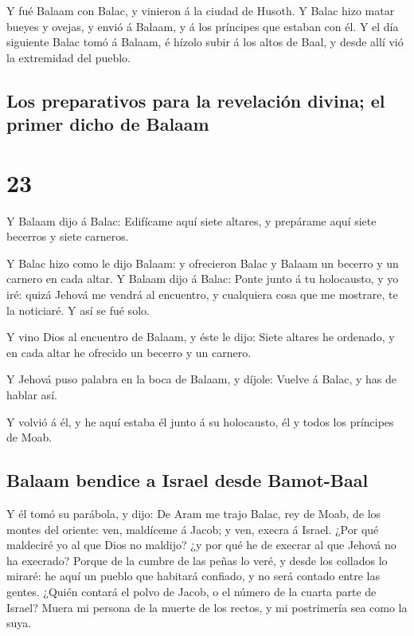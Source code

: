  Y fué Balaam con Balac, y vinieron á la ciudad de
Husoth.  Y Balac hizo matar bueyes y ovejas, y envió á
Balaam, y á los príncipes que estaban con él.  Y el día
siguiente Balac tomó á Balaam, é hízolo subir á los altos de Baal, y
desde allí vió la extremidad del pueblo.

\hypertarget{los-preparativos-para-la-revelaciuxf3n-divina-el-primer-dicho-de-balaam}{%
\subsection{Los preparativos para la revelación divina; el primer dicho
de
Balaam}\label{los-preparativos-para-la-revelaciuxf3n-divina-el-primer-dicho-de-balaam}}

\hypertarget{section-22}{%
\section{23}\label{section-22}}

 Y Balaam dijo á Balac: Edifícame aquí siete altares, y
prepárame aquí siete becerros y siete carneros.

 Y Balac hizo como le dijo Balaam: y ofrecieron Balac y
Balaam un becerro y un carnero en cada altar.  Y Balaam
dijo á Balac: Ponte junto á tu holocausto, y yo iré: quizá Jehová me
vendrá al encuentro, y cualquiera cosa que me mostrare, te la noticiaré.
Y así se fué solo.

 Y vino Dios al encuentro de Balaam, y éste le dijo: Siete
altares he ordenado, y en cada altar he ofrecido un becerro y un
carnero.

 Y Jehová puso palabra en la boca de Balaam, y díjole:
Vuelve á Balac, y has de hablar así.

 Y volvió á él, y he aquí estaba él junto á su holocausto,
él y todos los príncipes de Moab.

\hypertarget{balaam-bendice-a-israel-desde-bamot-baal}{%
\subsection{Balaam bendice a Israel desde
Bamot-Baal}\label{balaam-bendice-a-israel-desde-bamot-baal}}

 Y él tomó su parábola, y dijo: De Aram me trajo Balac,
rey de Moab, de los montes del oriente: ven, maldíceme á Jacob; y ven,
execra á Israel.  ¿Por qué maldeciré yo al que Dios no
maldijo? ¿y por qué he de execrar al que Jehová no ha execrado?
 Porque de la cumbre de las peñas lo veré, y desde los
collados lo miraré: he aquí un pueblo que habitará confiado, y no será
contado entre las gentes.  ¿Quién contará el polvo de
Jacob, o el número de la cuarta parte de Israel? Muera mi persona de la
muerte de los rectos, y mi postrimería sea como la suya.


